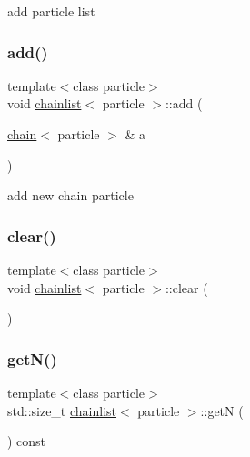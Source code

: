 add particle list 

\hypertarget{classchainlist_a7ef6693832504d519150bf5afff71310}{}\label{classchainlist_a7ef6693832504d519150bf5afff71310} 
\subsubsection{\texorpdfstring{add()}{add()}\hspace{0.1cm}{\footnotesize\ttfamily [3/3]}}
{\footnotesize\ttfamily template$<$class particle$>$ \\
void \hyperlink{classchainlist}{chainlist}$<$ particle $>$\+::add (\begin{DoxyParamCaption}\item[{\hyperlink{classchain}{chain}$<$ particle $>$ \&}]{a }\end{DoxyParamCaption})\hspace{0.3cm}{\ttfamily [inline]}}



add new chain particle 

\hypertarget{classchainlist_ab3e3716be84c058ad25637602f1712e0}{}\label{classchainlist_ab3e3716be84c058ad25637602f1712e0} 
\subsubsection{\texorpdfstring{clear()}{clear()}}
{\footnotesize\ttfamily template$<$class particle$>$ \\
void \hyperlink{classchainlist}{chainlist}$<$ particle $>$\+::clear (\begin{DoxyParamCaption}{ }\end{DoxyParamCaption})\hspace{0.3cm}{\ttfamily [inline]}}

\hypertarget{classchainlist_a828ce844e9b009c9da96a6ea613ebf73}{}\label{classchainlist_a828ce844e9b009c9da96a6ea613ebf73} 
\subsubsection{\texorpdfstring{get\+N()}{getN()}}
{\footnotesize\ttfamily template$<$class particle$>$ \\
std\+::size\+\_\+t \hyperlink{classchainlist}{chainlist}$<$ particle $>$\+::getN (\begin{DoxyParamCaption}{ }\end{DoxyParamCaption}) const\hspace{0.3cm}{\ttfamily [inline]}}



